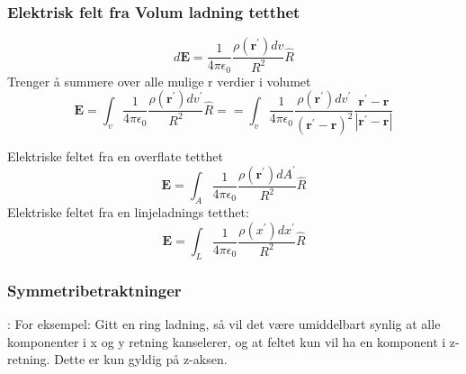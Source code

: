 \documentclass[
12pt, reprint, aip, onecolumn, notitlepage
]{revtex4-1}
\begin{document}
\subsubsection{Elektrisk felt fra Volum ladning tetthet}
\begin{equation}
d \mathbf{E}=\frac{1}{4 \pi \epsilon_{0}} \frac{\rho\left(\mathbf{r}^{\prime}\right) d v}{R^{2}} \hat{R}
\end{equation}
Trenger å summere over alle mulige r verdier i volumet
\begin{equation}
\mathbf{E}=\int_{v} \frac{1}{4 \pi \epsilon_{0}} \frac{\rho\left(\mathbf{r}^{\prime}\right) d v^{\prime}}{R^{2}} \hat{R} = =\int_{v} \frac{1}{4 \pi \epsilon_{0}} \frac{\rho\left(\mathbf{r}^{\prime}\right) d v^{\prime}}{\left(\mathbf{r}^{\prime}-\mathbf{r}\right)^{2}} \frac{\mathbf{r}^{\prime}-\mathbf{r}}{\left|\mathbf{r}^{\prime}-\mathbf{r}\right|}
\end{equation}

Elektriske feltet fra en overflate tetthet
\begin{equation}
\mathbf{E}=\int_{A} \frac{1}{4 \pi \epsilon_{0}} \frac{\rho\left(\mathbf{r}^{\prime}\right) d A^{\prime}}{R^{2}} \hat{R}
\end{equation}
Elektriske feltet fra en linjeladnings tetthet:
\begin{equation}
\mathbf{E}=\int_{L} \frac{1}{4 \pi \epsilon_{0}} \frac{\rho\left(x^{\prime}\right) d x^{\prime}}{R^{2}} \hat{R}
\end{equation}
\subsubsection{Symmetribetraktninger}:
For eksempel: Gitt en ring ladning, så vil det være umiddelbart synlig at alle komponenter i x og y retning kanselerer, og at feltet kun vil ha en komponent i z-retning. Dette er kun gyldig på z-aksen.
\end{document}

